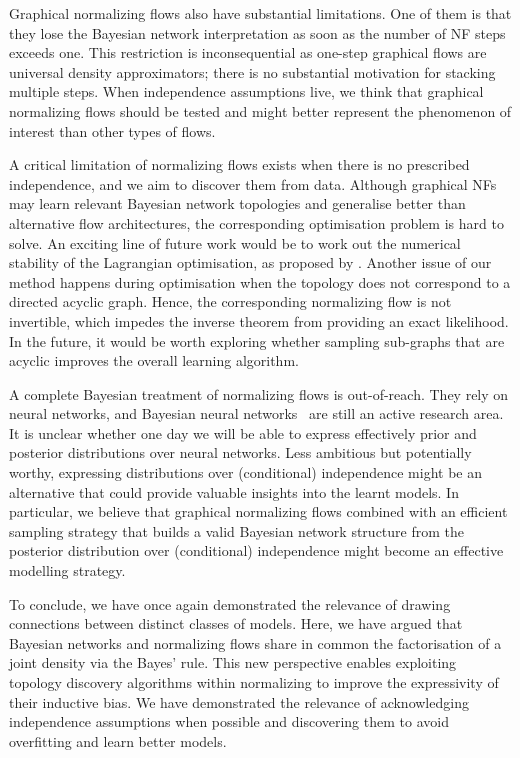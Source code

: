 Graphical normalizing flows also have substantial limitations. One of them is that they lose the Bayesian network interpretation as soon as the number of NF steps exceeds one. This restriction is inconsequential as one-step graphical flows are universal density approximators; there is no substantial motivation for stacking multiple steps. When independence assumptions live, we think that graphical normalizing flows should be tested and might better represent the phenomenon of interest than other types of flows.

A critical limitation of normalizing flows exists when there is no prescribed independence, and we aim to discover them from data. Although graphical NFs may learn relevant Bayesian network topologies and generalise better than alternative flow architectures, the corresponding optimisation problem is hard to solve. An exciting line of future work would be to work out the numerical stability of the Lagrangian optimisation, as proposed by \citet{ng2022convergence}. Another issue of our method happens during optimisation when the topology does not correspond to a directed acyclic graph. Hence, the corresponding normalizing flow is not invertible, which impedes the inverse theorem from providing an exact likelihood. In the future, it would be worth exploring whether sampling sub-graphs that are acyclic improves the overall learning algorithm.

A complete Bayesian treatment of normalizing flows is out-of-reach. They rely on neural networks, and Bayesian neural networks~\citep{mackay1995bayesian} are still an active research area. It is unclear whether one day we will be able to express effectively prior and posterior distributions over neural networks. Less ambitious but potentially worthy, expressing distributions over (conditional) independence might be an alternative that could provide valuable insights into the learnt models. In particular, we believe that graphical normalizing flows combined with an efficient sampling strategy that builds a valid Bayesian network structure from the posterior distribution over (conditional) independence might become an effective modelling strategy.

To conclude, we have once again demonstrated the relevance of drawing connections between distinct classes of models. Here, we have argued that Bayesian networks and normalizing flows share in common the factorisation of a joint density via the Bayes' rule. This new perspective enables exploiting topology discovery algorithms within normalizing to improve the expressivity of their inductive bias. We have demonstrated the relevance of acknowledging independence assumptions when possible and discovering them to avoid overfitting and learn better models.

